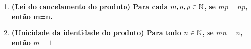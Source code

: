 \documentclass[%
  a4paper,%
  12pt,%
  fleqn,%
  english,%
  brazilian,%
]{article}
\begin{document}
\begin{enumerate}[wide, labelwidth=!, labelindent=0pt]
\begin{enumerate}[label=\alph*)]
      \item \textbf{(Lei do cancelamento do produto) Para cada $m,n,p \in \mathbb N$, se $mp=np$, então m=n.}
        \\
      
      \item \textbf{(Unicidade da identidade do produto) Para todo $n \in \mathbb N$, se $mn = n$, então $m = 1$}\\
        \\
      

  \end{enumerate} 
	  \vspace{3mm}
  
\end{enumerate}
\end{document}
